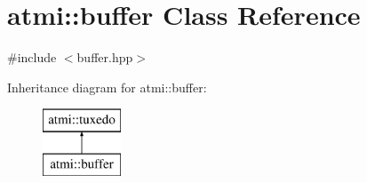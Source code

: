 \hypertarget{classatmi_1_1buffer}{\section{atmi\+:\+:buffer Class Reference}
\label{classatmi_1_1buffer}
}


{\ttfamily \#include $<$buffer.\+hpp$>$}

Inheritance diagram for atmi\+:\+:buffer\+:\begin{figure}[H]
\begin{center}
\leavevmode
\includegraphics[height=2.000000cm]{classatmi_1_1buffer}
\end{center}
\end{figure}
